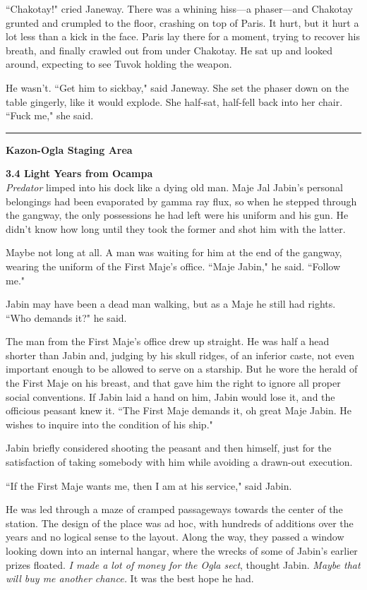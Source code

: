 \documentclass[twoside,letterpaper,12pt]{memoir}
\begin{document}
``Chakotay!" cried Janeway. There was a whining hiss---a phaser---and Chakotay grunted and crumpled to the floor, crashing on top of Paris. It hurt, but it hurt a lot less than a kick in the face. Paris lay there for a moment, trying to recover his breath, and finally crawled out from under Chakotay. He sat up and looked around, expecting to see Tuvok holding the weapon.

He wasn't. ``Get him to sickbay," said Janeway. She set the phaser down on the table gingerly, like it would explode. She half-sat, half-fell back into her chair. ``Fuck me," she said.

\fancybreak{\rule{3cm}{0.4 pt}}
\noindent\textbf{Kazon-Ogla Staging Area}

\noindent\textbf{3.4 Light Years from Ocampa}\\

\textit{Predator} limped into his dock like a dying old man. Maje Jal Jabin's personal belongings had been evaporated by gamma ray flux, so when he stepped through the gangway, the only possessions he had left were his uniform and his gun. He didn't know how long until they took the former and shot him with the latter.

Maybe not long at all. A man was waiting for him at the end of the gangway, wearing the uniform of the First Maje's office. ``Maje Jabin," he said. ``Follow me."

Jabin may have been a dead man walking, but as a Maje he still had rights. ``Who demands it?" he said.

The man from the First Maje's office drew up straight. He was half a head shorter than Jabin and, judging by his skull ridges, of an inferior caste, not even important enough to be allowed to serve on a starship. But he wore the herald of the First Maje on his breast, and that gave him the right to ignore all proper social conventions. If Jabin laid a hand on him, Jabin would lose it, and the officious peasant knew it. ``The First Maje demands it, oh great Maje Jabin. He wishes to inquire into the condition of his ship."

Jabin briefly considered shooting the peasant and then himself, just for the satisfaction of taking somebody with him while avoiding a drawn-out execution.

``If the First Maje wants me, then I am at his service," said Jabin.

He was led through a maze of cramped passageways towards the center of the station. The design of the place was ad hoc, with hundreds of additions over the years and no logical sense to the layout. Along the way, they passed a window looking down into an internal hangar, where the wrecks of some of Jabin's earlier prizes floated. \textit{I made a lot of money for the Ogla sect}, thought Jabin. \textit{Maybe that will buy me another chance.} It was the best hope he had.
\end{document}
